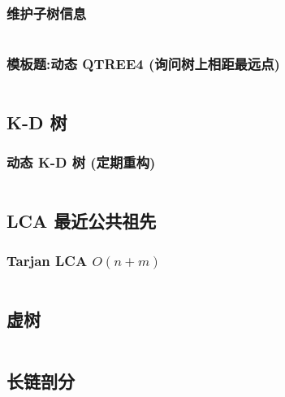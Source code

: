 \documentclass[a4paper, twoside]{article}
\begin{document}
\begin{multicols}{2}
				\subsubsection{维护子树信息}
					\inputminted{cpp}{../src/datastructure/LCT维护子树信息.cpp}
					
				\subsubsection[模板题：动态QTREE4]{模板题:动态 QTREE4 (询问树上相距最远点)}
						\inputminted{cpp}{../src/datastructure/动态QTREE4.cpp}
	
			\subsection{K-D 树}

				\subsubsection{动态 K-D 树 (定期重构)}
					\inputminted{cpp}{../src/datastructure/动态KD树.cpp}
	
	
	
			
			\subsection{LCA 最近公共祖先}
				\subsubsection{Tarjan LCA $O(n + m)$}
					\inputminted{cpp}{../src/datastructure/tarjanlca.cpp}

			\subsection{虚树}
				\inputminted{cpp}{../src/datastructure/虚树.cpp}
	
			\subsection{长链剖分}
				\inputminted{cpp}{../src/datastructure/长链剖分.cpp}
	

\end{multicols}
\end{document}
